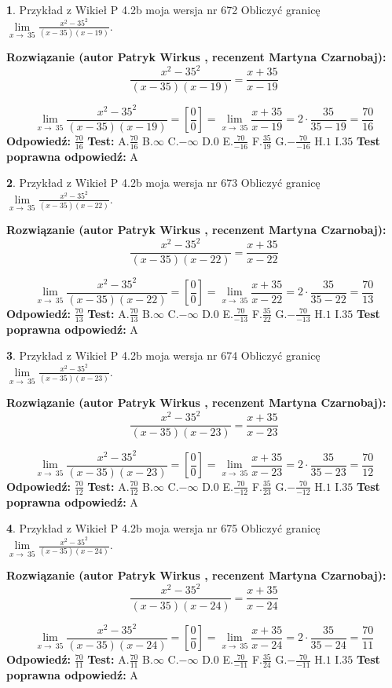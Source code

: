 \documentclass[12pt, a4paper]{article}
\theoremstyle{definition} %
\newtheorem{zad}{}
\newcommand{\zadStart}[1]{\begin{zad}#1\newline}
\newcommand{\zadStop}{\end{zad}}
\newcommand{\rozwStart}[2]{\noindent \textbf{Rozwiązanie (autor #1 , recenzent #2): }\newline}
\newcommand{\rozwStop}{\newline}
\newcommand{\odpStart}{\noindent \textbf{Odpowiedź:}\newline}
\newcommand{\odpStop}{\newline}
\newcommand{\testStart}{\noindent \textbf{Test:}\newline}
\newcommand{\testStop}{\newline}
\newcommand{\kluczStart}{\noindent \textbf{Test poprawna odpowiedź:}\newline}
\newcommand{\kluczStop}{\newline}
\begin{document}
\zadStart{Przykład z Wikieł P 4.2b moja wersja nr 672}
Obliczyć granicę $\lim\limits_{x\to\ 35}\frac{x^{2}-35^{2}}{(x-35)(x-19)}$.
\zadStop
\rozwStart{Patryk Wirkus}{Martyna Czarnobaj}
$$\frac{x^{2}-35^{2}}{(x-35)(x-19)}=\frac{x+35}{x-19}$$

$$\lim\limits_{x\to\ 35}\frac{x^{2}-35^{2}}{(x-35)(x-19)}=[\frac{0}{0}]=\lim\limits_{x\to\ 35}\frac{x+35}{x-19}=2 \cdot \frac{35}{35-19} = \frac{70}{16}$$
\rozwStop
\odpStart
$\frac{70}{16}$
\odpStop
\testStart
A.$\frac{70}{16}$
B.$\infty$
C.$-\infty$
D.$0$
E.$\frac{70}{-16}$
F.$\frac{35}{19}$
G.$-\frac{70}{-16}$
H.$1$
I.$35$
\testStop
\kluczStart
A
\kluczStop



\zadStart{Przykład z Wikieł P 4.2b moja wersja nr 673}
Obliczyć granicę $\lim\limits_{x\to\ 35}\frac{x^{2}-35^{2}}{(x-35)(x-22)}$.
\zadStop
\rozwStart{Patryk Wirkus}{Martyna Czarnobaj}
$$\frac{x^{2}-35^{2}}{(x-35)(x-22)}=\frac{x+35}{x-22}$$

$$\lim\limits_{x\to\ 35}\frac{x^{2}-35^{2}}{(x-35)(x-22)}=[\frac{0}{0}]=\lim\limits_{x\to\ 35}\frac{x+35}{x-22}=2 \cdot \frac{35}{35-22} = \frac{70}{13}$$
\rozwStop
\odpStart
$\frac{70}{13}$
\odpStop
\testStart
A.$\frac{70}{13}$
B.$\infty$
C.$-\infty$
D.$0$
E.$\frac{70}{-13}$
F.$\frac{35}{22}$
G.$-\frac{70}{-13}$
H.$1$
I.$35$
\testStop
\kluczStart
A
\kluczStop



\zadStart{Przykład z Wikieł P 4.2b moja wersja nr 674}
Obliczyć granicę $\lim\limits_{x\to\ 35}\frac{x^{2}-35^{2}}{(x-35)(x-23)}$.
\zadStop
\rozwStart{Patryk Wirkus}{Martyna Czarnobaj}
$$\frac{x^{2}-35^{2}}{(x-35)(x-23)}=\frac{x+35}{x-23}$$

$$\lim\limits_{x\to\ 35}\frac{x^{2}-35^{2}}{(x-35)(x-23)}=[\frac{0}{0}]=\lim\limits_{x\to\ 35}\frac{x+35}{x-23}=2 \cdot \frac{35}{35-23} = \frac{70}{12}$$
\rozwStop
\odpStart
$\frac{70}{12}$
\odpStop
\testStart
A.$\frac{70}{12}$
B.$\infty$
C.$-\infty$
D.$0$
E.$\frac{70}{-12}$
F.$\frac{35}{23}$
G.$-\frac{70}{-12}$
H.$1$
I.$35$
\testStop
\kluczStart
A
\kluczStop



\zadStart{Przykład z Wikieł P 4.2b moja wersja nr 675}
Obliczyć granicę $\lim\limits_{x\to\ 35}\frac{x^{2}-35^{2}}{(x-35)(x-24)}$.
\zadStop
\rozwStart{Patryk Wirkus}{Martyna Czarnobaj}
$$\frac{x^{2}-35^{2}}{(x-35)(x-24)}=\frac{x+35}{x-24}$$

$$\lim\limits_{x\to\ 35}\frac{x^{2}-35^{2}}{(x-35)(x-24)}=[\frac{0}{0}]=\lim\limits_{x\to\ 35}\frac{x+35}{x-24}=2 \cdot \frac{35}{35-24} = \frac{70}{11}$$
\rozwStop
\odpStart
$\frac{70}{11}$
\odpStop
\testStart
A.$\frac{70}{11}$
B.$\infty$
C.$-\infty$
D.$0$
E.$\frac{70}{-11}$
F.$\frac{35}{24}$
G.$-\frac{70}{-11}$
H.$1$
I.$35$
\testStop
\kluczStart
A
\kluczStop
\end{document}
